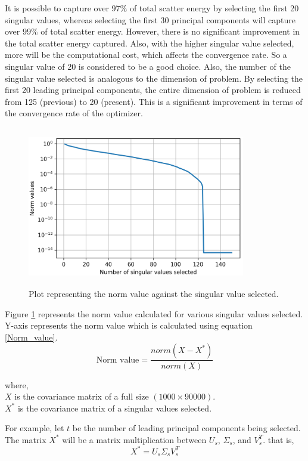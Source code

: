 It is possible to capture over $97\%$ of total scatter energy by selecting the first 20 singular values, whereas selecting the first 30 principal components will capture over $99\%$ of total scatter energy. However, there is no significant improvement in the total scatter energy captured. Also, with the higher singular value selected, more will be the computational cost, which affects the convergence rate. So a singular value of 20 is considered to be a good choice. Also, the number of the singular value selected is analogous to the dimension of problem. By selecting the first 20 leading principal components, the entire dimension of problem is reduced from 125 (previous) to 20 (present). This is a significant improvement in terms of the convergence rate of the optimizer.  
\begin{figure}[!htbp]
    \centering
    \includegraphics[width = 0.85\textwidth, height=70mm]{figures/norm_x_plot.png}
    \caption{Plot representing the norm value against the singular value selected.}
    \label{norm plot}
\end{figure}

Figure \ref{norm plot} represents the norm value calculated for various singular values selected. Y-axis represents the norm value which is calculated using equation \ref{Norm_value}.
\begin{equation}
    \text{Norm value} = \frac{norm (X - X^*)}{norm (X)}
    \label{Norm_value}
\end{equation}

where,\\
$X$ is the covariance matrix of a full size $(1000 \times 90000)$.\\
$X^*$ is the covariance matrix of a singular values selected.

For example, let $t$ be the number of leading principal components being selected. The matrix $X^*$ will be a matrix multiplication between $U_s$, $\Sigma_s$, and $V^T_s$. that is, $$X^* = U_s \Sigma_s V^T_s$$

